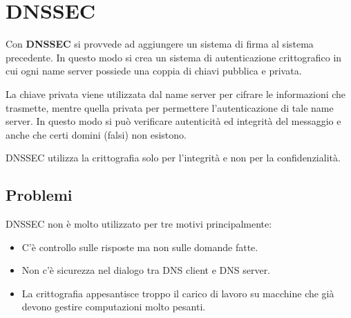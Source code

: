 \section{DNSSEC}
Con \textbf{DNSSEC} si provvede ad aggiungere un sistema di firma al sistema precedente. In questo modo si crea
un sistema di autenticazione crittografico in cui ogni name server possiede una coppia di chiavi pubblica e privata.

La chiave privata viene utilizzata dal name server per cifrare le informazioni che trasmette, mentre quella privata
per permettere l'autenticazione di tale name server. In questo modo si può verificare autenticità ed integrità del
messaggio e anche che certi domini (falsi) non esistono.

DNSSEC utilizza la crittografia solo per l'integrità e non per la confidenzialità.

\subsection{Problemi}
DNSSEC non è molto utilizzato per tre motivi principalmente:
\begin{itemize}
	\item C'è controllo sulle risposte ma non sulle domande fatte.
	\item Non c'è sicurezza nel dialogo tra DNS client e DNS server.
	\item La crittografia appesantisce troppo il carico di lavoro su macchine che già devono gestire computazioni
	      molto pesanti.
\end{itemize}